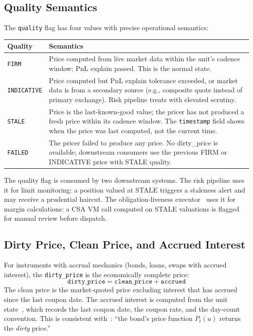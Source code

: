 \documentclass[11pt,a4paper]{article}
\begin{document}
\subsection{Quality Semantics}

The \texttt{quality} flag has four values with precise operational semantics:

\begin{center}
\small
\begin{tabular}{l p{9cm}}
\toprule
\textbf{Quality} & \textbf{Semantics} \\
\midrule
\texttt{FIRM} & Price computed from live market data within the unit's cadence window; PnL explain passed.  This is the normal state. \\
\texttt{INDICATIVE} & Price computed but PnL explain tolerance exceeded, or market data is from a secondary source (e.g., composite quote instead of primary exchange).  Risk pipeline treats with elevated scrutiny. \\
\texttt{STALE} & Price is the last-known-good value; the pricer has not produced a fresh price within its cadence window.  The \texttt{timestamp} field shows when the price was last computed, not the current time. \\
\texttt{FAILED} & The pricer failed to produce any price.  No dirty\_price is available; downstream consumers use the previous FIRM or INDICATIVE price with STALE quality. \\
\bottomrule
\end{tabular}
\end{center}

\noindent The quality flag is consumed by two downstream systems.  The risk pipeline uses it for limit monitoring: a position valued at STALE triggers a staleness alert and may receive a prudential haircut.  The obligation-liveness executor~\cite[\S14.7]{ledger} uses it for margin calculations: a CSA VM call computed on STALE valuations is flagged for manual review before dispatch.

\subsection{Dirty Price, Clean Price, and Accrued Interest}

For instruments with accrual mechanics (bonds, loans, swaps with accrued interest), the \texttt{dirty\_price} is the economically complete price:
\[
\texttt{dirty\_price} = \texttt{clean\_price} + \texttt{accrued}
\]
The clean price is the market-quoted price excluding interest that has accrued since the last coupon date.  The accrued interest is computed from the unit state~\cite[\S7]{ledger}, which records the last coupon date, the coupon rate, and the day-count convention.  This is consistent with~\cite[\S5.3]{ledger}: ``the bond's price function $P_t(u)$ returns the \emph{dirty} price.''
\end{document}
